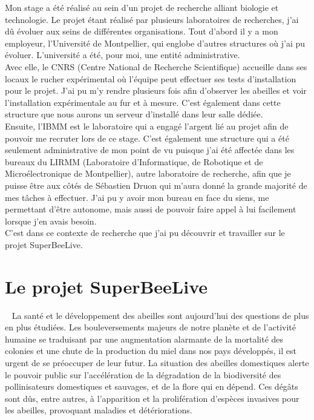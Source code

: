 \documentclass[11pt,french,a4paper]{report}
\begin{document}
Mon stage a été réalisé au sein d'un projet de recherche alliant biologie et technologie. 
Le projet étant réalisé par plusieurs laboratoires de recherches, j'ai dû évoluer aux seins de différentes organisations. 
Tout d'abord il y a mon employeur, l'Université de Montpellier, qui englobe d'autres structures où j'ai pu évoluer. 
L'université a été, pour moi, une entité administrative. \\ 
Avec elle, le CNRS (Centre National de Recherche Scientifique) accueille dans ses locaux le rucher expérimental où 
l'équipe peut effectuer ses tests d'installation pour le projet. J'ai pu m'y rendre plusieurs fois afin d'observer les abeilles
et voir l'installation expérimentale au fur et à mesure. C'est également dans cette structure que nous aurons un serveur 
d'installé dans leur salle dédiée.\\

Ensuite, l'IBMM est le laboratoire qui a engagé l'argent lié au projet afin de pouvoir me recruter lors de ce stage. 
C'est également une structure qui a été seulement administrative de mon point de vu puisque j'ai été affectée dans 
les bureaux du LIRMM (Laboratoire d'Informatique, de Robotique et de Microélectronique de Montpellier), autre laboratoire de 
recherche, afin que je puisse être aux côtés de Sébastien Druon qui m'aura donné la grande majorité de mes tâches à effectuer. 
J'ai pu y avoir mon bureau en face du siens, me permettant d'être autonome, mais aussi de pouvoir faire
appel à lui facilement lorsque j'en avais besoin.\\

C'est dans ce contexte de recherche que j'ai pu découvrir et travailler sur le projet SuperBeeLive. \\ 


\section{Le projet SuperBeeLive}
 
La santé et le développement des abeilles sont aujourd’hui des questions de plus en plus étudiées. Les bouleversements
majeurs de notre planète et de l’activité humaine se traduisant par une augmentation alarmante de la mortalité
des colonies et une chute de la production du miel dans nos pays développés, il est urgent de se préoccuper de leur futur. 
La situation des abeilles domestiques alerte le pouvoir public sur l’accélération de la dégradation de la biodiversité des 
pollinisateurs domestiques et sauvages, et de la flore qui en dépend. Ces dégâts sont dûs, entre autres, à l’apparition 
et la prolifération d’espèces invasives pour les abeilles, provoquant maladies et détériorations. \\ 
\end{document}
